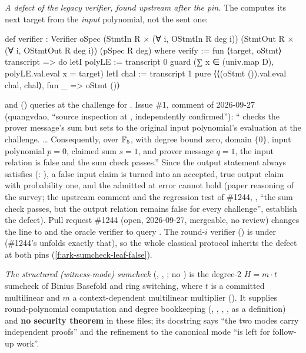 \emph{A defect of the legacy verifier, found upstream after the pin.} The
 computes its next target from the \emph{input} polynomial, not the sent
one:
\begin{leancode}
def verifier : Verifier oSpec (StmtIn R × (∀ i, OStmtIn R deg i))
    (StmtOut R × (∀ i, OStmtOut R deg i)) (pSpec R deg) where
  verify := fun ⟨target, oStmt⟩ transcript => do
    letI polyLE := transcript 0
    guard (∑ x ∈ (univ.map D), polyLE.val.eval x = target)
    letI chal := transcript 1
    pure ⟨⟨(oStmt ()).val.eval chal, chal⟩, fun _ => oStmt ()⟩
\end{leancode}
and  () queries  at the
challenge for . Issue \#1, comment of 2026-09-27 (quangvdao, ``source inspection
at , independently confirmed''): ``
checks the prover message's sum but sets  to the original input polynomial's
evaluation at the challenge. \ldots{} Consequently, over $\mathbb{F}_5$, with degree bound zero, domain
$\{0\}$, input polynomial $p = 0$, claimed sum $s = 1$, and prover message $q = 1$, the input
relation is false and the sum check passes.'' Since the output statement  always
satisfies  (: ), a false
input claim is turned into an accepted, true output claim with probability one, and the admitted
 at error  cannot hold (paper
reasoning of the survey; the upstream comment and the regression test of \#1244,
, ``the sum check passes, but the
output relation remains false for every challenge'', establish the defect). Pull request \#1244
(open, 2026-09-27, mergeable, no review) changes the line to  and the
oracle verifier to query . The round-$i$ verifier ()
is  under  (\#1244's  unfolds
exactly that), so the whole classical protocol inherits the defect at both pins
(\cref{f:ark-sumcheck-leaf-false}).

\emph{The structured (witness-mode) sumcheck} (,
, ; no ) is the
degree-2 $H = m \cdot t$ sumcheck of Binius Basefold and ring switching, where $t$ is a committed
multilinear and $m$ a context-dependent multilinear multiplier (). It
supplies round-polynomial computation and degree bookkeeping (,
, , ,
 as a definition) and \textbf{no security theorem} in these
files; its docstring says ``the two modes carry independent proofs'' and the refinement to the
canonical mode ``is left for follow-up work''.

